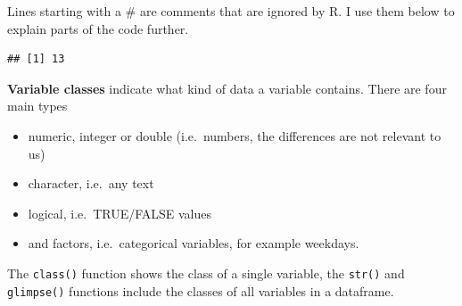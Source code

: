 \documentclass[
]{book}
\newenvironment{Shaded}{\begin{snugshade}}{\end{snugshade}}
\newcommand{\CommentTok}[1]{\textcolor[rgb]{0.56,0.35,0.01}{\textit{#1}}}
\newcommand{\DataTypeTok}[1]{\textcolor[rgb]{0.13,0.29,0.53}{#1}}
\newcommand{\DecValTok}[1]{\textcolor[rgb]{0.00,0.00,0.81}{#1}}
\newcommand{\KeywordTok}[1]{\textcolor[rgb]{0.13,0.29,0.53}{\textbf{#1}}}
\newcommand{\NormalTok}[1]{#1}
\newcommand{\OperatorTok}[1]{\textcolor[rgb]{0.81,0.36,0.00}{\textbf{#1}}}
\newcommand{\StringTok}[1]{\textcolor[rgb]{0.31,0.60,0.02}{#1}}
\providecommand{\tightlist}{%
  \setlength{\itemsep}{0pt}\setlength{\parskip}{0pt}}
\begin{document}
Lines starting with a \# are comments that are ignored by R. I use them below to explain parts of the code further.

\begin{Shaded}
\end{Shaded}

\begin{verbatim}
## [1] 13
\end{verbatim}

\textbf{Variable classes} indicate what kind of data a variable contains. There are four main types

\begin{itemize}
\tightlist
\item
  numeric, integer or double (i.e.~numbers, the differences are not relevant to us)
\item
  character, i.e.~any text
\item
  logical, i.e.~TRUE/FALSE values
\item
  and factors, i.e.~categorical variables, for example weekdays.
\end{itemize}

The \texttt{class()} function shows the class of a single variable, the \texttt{str()} and \texttt{glimpse()} functions include the classes of all variables in a dataframe.
\end{document}
